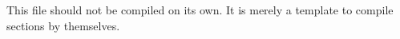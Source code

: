\documentclass[article]{memoir}
\begin{document}
This file should not be compiled on its own. It is merely a template to
compile sections by themselves.
\end{document}
